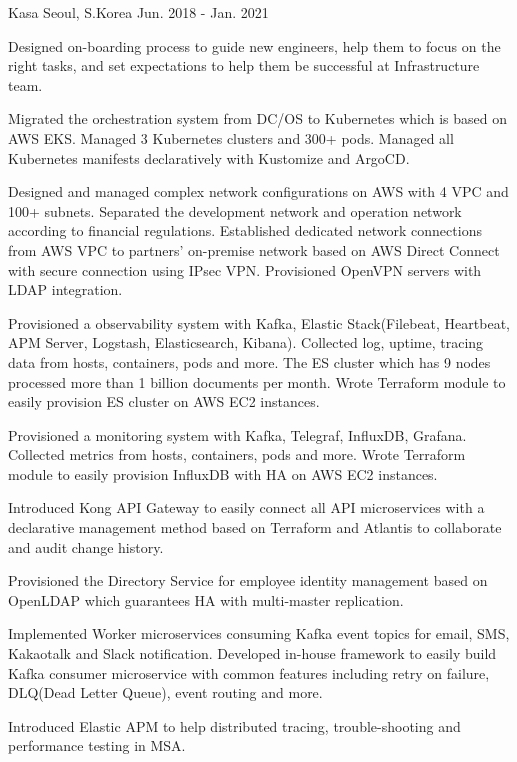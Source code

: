 \begin{cventries}
	{Kasa} %
	{Seoul, S.Korea} %
	{Jun. 2018 - Jan. 2021} %
	{
		\begin{cvitems} %
			\item {Designed on-boarding process to guide new engineers, help them to focus on the right tasks, and set expectations to help them be successful at Infrastructure team.}
			\item {Migrated the orchestration system from DC/OS to Kubernetes which is based on AWS EKS. Managed 3 Kubernetes clusters and 300+ pods. Managed all Kubernetes manifests declaratively with Kustomize and ArgoCD.}
			\item {Designed and managed complex network configurations on AWS with 4 VPC and 100+ subnets. Separated the development network and operation network according to financial regulations. Established dedicated network connections from AWS VPC to partners' on-premise network based on AWS Direct Connect with secure connection using IPsec VPN. Provisioned OpenVPN servers with LDAP integration.}
			\item {Provisioned a observability system with Kafka, Elastic Stack(Filebeat, Heartbeat, APM Server, Logstash, Elasticsearch, Kibana). Collected log, uptime, tracing data from hosts, containers, pods and more. The ES cluster which has 9 nodes processed more than 1 billion documents per month. Wrote Terraform module to easily provision ES cluster on AWS EC2 instances.}
			\item {Provisioned a monitoring system with Kafka, Telegraf, InfluxDB, Grafana. Collected metrics from hosts, containers, pods and more. Wrote Terraform module to easily provision InfluxDB with HA on AWS EC2 instances.}
			\item {Introduced Kong API Gateway to easily connect all API microservices with a declarative management method based on Terraform and Atlantis to collaborate and audit change history.}
			\item {Provisioned the Directory Service for employee identity management based on OpenLDAP which guarantees HA with multi-master replication.}
			\item {Implemented Worker microservices consuming Kafka event topics for email, SMS, Kakaotalk and Slack notification. Developed in-house framework to easily build Kafka consumer microservice with common features including retry on failure, DLQ(Dead Letter Queue), event routing and more.}
			\item {Introduced Elastic APM to help distributed tracing, trouble-shooting and performance testing in MSA.}
		\end{cvitems}
	}


\end{cventries}
